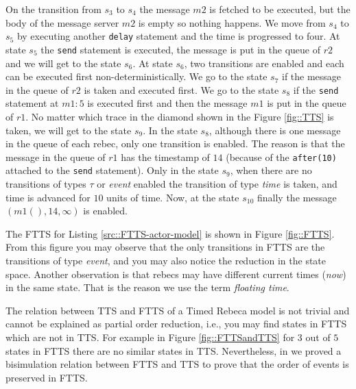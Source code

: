 On the transition from $s_3$ to $s_4$ the message $m2$ is fetched to be executed, but the body of the message server $m2$ is empty so nothing happens. We move from $s_4$ to $s_5$ by executing another \texttt{delay} statement and the time is progressed to four.
At state $s_5$ the \texttt{send} statement is executed, the message is put in the queue of $r2$ and we will get to the state $s_6$.
At state $s_6$, two transitions are enabled and each can be  executed first non-deterministically. 
We go to the state $s_7$ if the message in the queue of $r2$ is taken and executed first. We go to the state $s_8$ if the \texttt{send} statement at $m1:5$  is executed first and then the message $m1$ is put in the queue of $r1$. No matter which trace in the diamond shown in the Figure \ref{fig::TTS} is taken, we will get to the state $s_9$.
In the state $s_8$, although there is one message in the queue of each rebec, only one transition is enabled. The reason is that   the message in the queue of $r1$ has the timestamp of $14$ (because of the \texttt{after(10)} attached to the \texttt{send} statement).
Only in the state $s_9$, when there are no transitions of types $\tau$ or \textit{event}  enabled the transition of type \textit{time} is taken, and time is advanced for $10$ units of time. Now, at the state $s_{10}$ finally the message $(m1(), 14,\infty )$ is enabled.

The FTTS for Listing \ref{src::FTTS-actor-model} is shown in Figure \ref{fig::FTTS}. From this figure you may observe that the only transitions in FTTS are the transitions of type \textit{event}, and you may also notice the reduction in the state space.
%
Another observation is that
rebecs may have different current times (\textit{now}) in the same state. That is the reason we use the term \textit{floating time}.


%
The relation between TTS and FTTS of a Timed Rebeca model is not trivial and cannot be explained as partial order reduction, i.e., you may find states in FTTS which are not in TTS.
For example in Figure \ref{fig::FTTSandTTS} for $3$ out of $5$ states in FTTS there are no similar states in TTS. Nevertheless, in \cite{DBLP:conf/facs2/KhamespanahSVK15} we proved a bisimulation relation between FTTS and TTS to prove that the order of events is preserved in FTTS.

